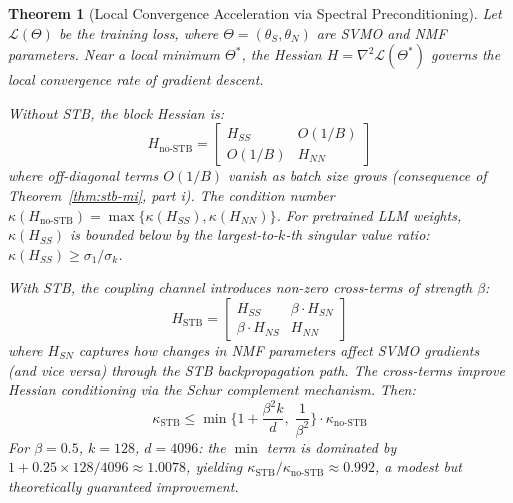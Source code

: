 \documentclass{scpe}
\newtheorem{theorem}{Theorem}[section]
\begin{document}
\begin{theorem}[Local Convergence Acceleration via Spectral Preconditioning]
\label{thm:stb-conv}
Let $\mathcal{L}(\Theta)$ be the training loss, where $\Theta = (\theta_S, \theta_N)$ are SVMO and NMF parameters. Near a local minimum $\Theta^*$, the Hessian $H = \nabla^2 \mathcal{L}(\Theta^*)$ governs the local convergence rate of gradient descent.

Without STB, the block Hessian is:
\begin{equation}
H_{\text{no-STB}} = \begin{bmatrix} H_{SS} & O(1/B) \\ O(1/B) & H_{NN} \end{bmatrix}
\end{equation}
where off-diagonal terms $O(1/B)$ vanish as batch size grows (consequence of Theorem~\ref{thm:stb-mi}, part i). The condition number $\kappa(H_{\text{no-STB}}) = \max\{\kappa(H_{SS}), \kappa(H_{NN})\}$. For pretrained LLM weights, $\kappa(H_{SS})$ is bounded below by the largest-to-$k$-th singular value ratio: $\kappa(H_{SS}) \geq \sigma_1/\sigma_k$.

With STB, the coupling channel introduces non-zero cross-terms of strength $\beta$:
\begin{equation}
H_{\text{STB}} = \begin{bmatrix} H_{SS} & \beta \cdot H_{SN} \\ \beta \cdot H_{NS} & H_{NN} \end{bmatrix}
\end{equation}
where $H_{SN}$ captures how changes in NMF parameters affect SVMO gradients (and vice versa) through the STB backpropagation path. The cross-terms improve Hessian conditioning via the Schur complement mechanism. Then:
\begin{equation}
\kappa_{\text{STB}} \leq \min\!\Big\{1 + \frac{\beta^2 k}{d},\; \frac{1}{\beta^2}\Big\} \cdot \kappa_{\text{no-STB}}
\end{equation}
For $\beta=0.5$, $k=128$, $d=4096$: the $\min$ term is dominated by $1 + 0.25 \times 128 / 4096 \approx 1.0078$, yielding $\kappa_{\text{STB}}/\kappa_{\text{no-STB}} \approx 0.992$, a modest but theoretically guaranteed improvement.
\end{theorem}
\end{document}
